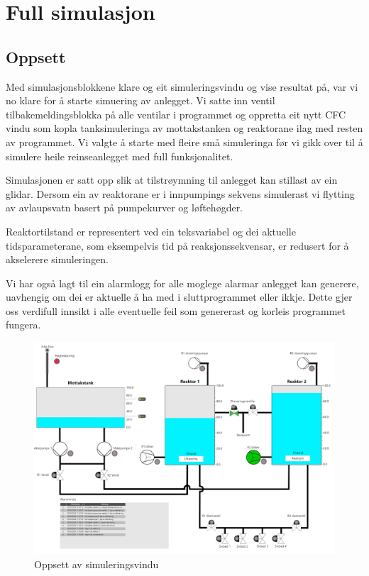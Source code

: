 \section{Full simulasjon}
\subsection{Oppsett}
Med simulasjonsblokkene klare og eit simuleringsvindu og vise resultat på, var vi
no klare for å starte simuering av anlegget.
Vi satte inn ventil tilbakemeldingsblokka på alle ventilar i programmet og oppretta eit
nytt CFC vindu som kopla tanksimuleringa av mottakstanken og reaktorane ilag med resten av
programmet. Vi valgte å starte med fleire små simuleringa før vi gikk over til å simulere heile reinseanlegget med full funksjonalitet.

Simulasjonen er satt opp slik at tilstrøymning til anlegget kan stillast av ein glidar.
Dersom ein av reaktorane er i innpumpings sekvens simulerast vi flytting av avlaupsvatn
basert på pumpekurver og løftehøgder.

Reaktortilstand er representert ved ein teksvariabel og
dei aktuelle tidsparameterane, som eksempelvis tid på reaksjonssekvensar,
er redusert for å akselerere simuleringen.

Vi har også lagt til ein alarmlogg for alle moglege alarmar anlegget kan generere, 
uavhengig om dei er aktuelle å ha med i sluttprogrammet eller ikkje.
Dette gjer oss verdifull innsikt i alle eventuelle feil som genererast og korleis programmet fungera.

\thispagestyle{fancy}
\begin{figure}[htbp]
    \centering
    \includegraphics[scale=0.45]{Bilder/Simuleringsbilde.png}
    \caption{Oppsett av simuleringsvindu}\label{fig:Simulering}
\end{figure}

